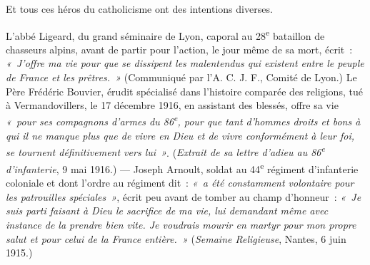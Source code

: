 \documentclass[french,twoside]{book} %
\begin{document}
Et tous ces héros du catholicisme ont des intentions diverses.‌\par
L’abbé Ligeard, du grand séminaire de Lyon, caporal au 28\textsuperscript{e} bataillon de chasseurs alpins, avant de partir pour l’action, le jour même de sa mort, écrit : \emph{« J’offre ma vie pour que se dissipent les malentendus qui existent entre le peuple de France et les prêtres. »} (Communiqué par l’A. C. J. F., Comité de Lyon.) Le Père Frédéric Bouvier, érudit spécialisé dans l’histoire comparée des religions, tué à Vermandovillers, le 17 décembre 1916, en assistant des blessés, offre sa vie \emph{« pour ses compagnons d’armes du 86\textsuperscript{e}, pour que tant d’hommes droits et bons à qui il ne manque plus que de vivre en Dieu et de vivre conformément à leur foi, se tournent définitivement vers lui »}. ({\itshape Extrait de sa lettre d’adieu au 86\textsuperscript{e} d’infanterie}, 9 mai 1916.) — Joseph Arnoult, soldat au 44\textsuperscript{e} régiment d’infanterie coloniale et dont l’ordre au régiment dit : \emph{« a été constamment volontaire pour les patrouilles spéciales »}, écrit peu avant de tomber au champ d’honneur : \emph{« Je suis parti faisant à Dieu le sacrifice de ma vie, lui demandant même avec instance de la prendre bien vite. Je voudrais mourir en martyr pour mon propre salut et pour celui de la France entière. »} ({\itshape Semaine Religieuse}, Nantes, 6 juin 1915.)‌\par
\end{document}
